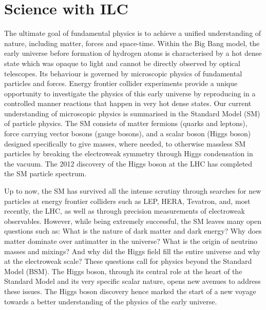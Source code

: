 \chapter{Science with ILC}
\label{chap:science}

The ultimate goal of fundamental physics is to achieve a unified understanding of nature, including matter, forces and space-time. Within the Big Bang model, the early universe before formation of hydrogen atoms is characterised by a hot dense state which was opaque to light and cannot be directly observed by optical telescopes. Its behaviour is governed by microscopic physics of fundamental particles and forces. Energy frontier collider experiments provide a unique opportunity to investigate the physics of this early universe by reproducing in a controlled manner reactions that happen in very hot dense states. Our current understanding of microscopic physics is summarised in the Standard Model (SM) of particle physics. The SM consists of matter fermions (quarks and leptons), force carrying vector bosons (gauge bosons), and a scalar boson (Higgs boson) designed specifically to give masses, where needed, to otherwise massless SM particles by breaking the electroweak symmetry through Higgs condensation in the vacuum. The 2012 discovery of the Higgs boson at the LHC has completed the SM particle spectrum. 

Up to now, the SM has survived all the intense scrutiny through searches for new particles at energy frontier colliders such as LEP, HERA, Tevatron, and, most recently, the LHC, as well as through precision measurements of electroweak observables. However, while being extremely successful, the SM leaves many open questions such as: What is the nature of dark matter and dark energy?  Why does matter dominate over antimatter in the universe? What is the origin of neutrino masses and mixings? And why did the Higgs field fill the entire universe and why at the electroweak scale? These questions call for physics beyond the Standard Model (BSM). The Higgs boson, through its central role at the heart of the Standard Model and its very specific scalar nature, opens new avenues to address these issues. The Higgs boson discovery hence marked the start of a new voyage towards a better understanding of the physics of the early universe.

